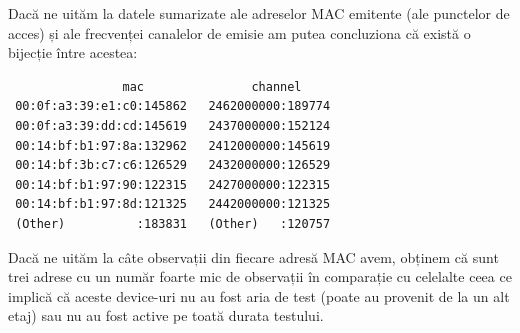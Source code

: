 \documentclass[]{article}
\begin{document}
Dacă ne uităm la datele sumarizate ale adreselor MAC emitente (ale
punctelor de acces) și ale frecvenței canalelor de emisie am putea
concluziona că există o bijecție între acestea:

\begin{verbatim}
                mac               channel      
 00:0f:a3:39:e1:c0:145862   2462000000:189774  
 00:0f:a3:39:dd:cd:145619   2437000000:152124  
 00:14:bf:b1:97:8a:132962   2412000000:145619  
 00:14:bf:3b:c7:c6:126529   2432000000:126529  
 00:14:bf:b1:97:90:122315   2427000000:122315  
 00:14:bf:b1:97:8d:121325   2442000000:121325  
 (Other)          :183831   (Other)   :120757  
\end{verbatim}

Dacă ne uităm la câte observații din fiecare adresă MAC avem, obținem că
sunt trei adrese cu un număr foarte mic de observații în comparație cu
celelalte ceea ce implică că aceste device-uri nu au fost aria de test
(poate au provenit de la un alt etaj) sau nu au fost active pe toată
durata testului.
\end{document}
